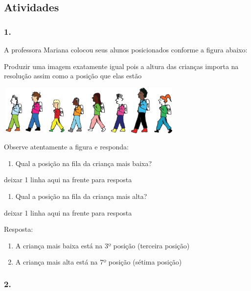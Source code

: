 \subsection{Atividades}\label{atividades-2}

\subsubsection{1.}\label{section-33}

A professora Mariana colocou seus alunos posicionados conforme a figura
abaixo:

Produzir uma imagem exatamente igual pois a altura das crianças importa
na resolução assim como a posição que elas estão

\includegraphics[width=3.62531in,height=0.96675in]{media/image27.png}

Observe atentamente a figura e responda:

\begin{enumerate}
\def\labelenumi{\alph{enumi})}
\item
  Qual a posição na fila da criança mais baixa?
\end{enumerate}

deixar 1 linha aqui na frente para resposta

\begin{enumerate}
\def\labelenumi{\alph{enumi})}
\item
  Qual a posição na fila da criança mais alta?
\end{enumerate}

deixar 1 linha aqui na frente para resposta

Resposta:

\begin{enumerate}
\def\labelenumi{\alph{enumi})}
\item
  A criança mais baixa está na 3º posição (terceira posição)
\item
  A criança mais alta está na 7º posição (sétima posição)
\end{enumerate}

\subsubsection{2.}\label{section-34}

